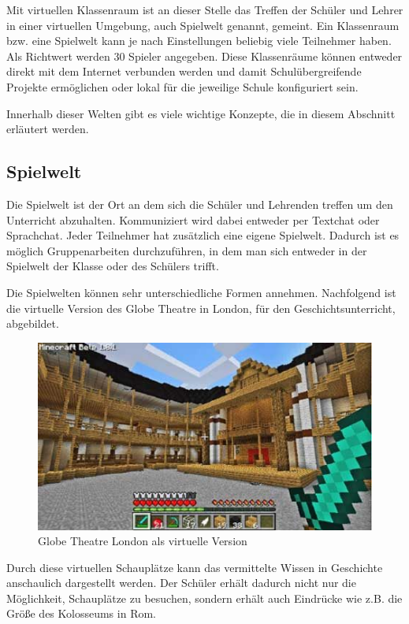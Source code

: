 Mit virtuellen Klassenraum ist an dieser Stelle das Treffen der Schüler und Lehrer in einer virtuellen Umgebung, auch Spielwelt genannt, gemeint. Ein Klassenraum bzw. eine Spielwelt kann je nach Einstellungen beliebig viele Teilnehmer haben. Als Richtwert werden 30 Spieler angegeben. Diese Klassenräume können entweder direkt mit dem Internet verbunden werden und damit Schulübergreifende Projekte ermöglichen oder lokal für die jeweilige Schule konfiguriert sein.

Innerhalb dieser Welten gibt es viele wichtige Konzepte, die in diesem Abschnitt erläutert werden.

\subsection{Spielwelt}

Die Spielwelt ist der Ort an dem sich die Schüler und Lehrenden treffen um den Unterricht abzuhalten.
Kommuniziert wird dabei entweder per Textchat oder Sprachchat. Jeder Teilnehmer hat zusätzlich eine eigene Spielwelt. Dadurch ist es möglich Gruppenarbeiten durchzuführen, in dem man sich entweder in der Spielwelt der Klasse oder des Schülers trifft.

Die Spielwelten können sehr unterschiedliche Formen annehmen. Nachfolgend ist die virtuelle Version des Globe Theatre in London, für den Geschichtsunterricht, abgebildet.

\begin{figure}[ht]
	\centering
	\includegraphics[width=\textwidth,height=\textheight,keepaspectratio]{images/GlobeTheatreLondon.png}
	\caption{Globe Theatre London als virtuelle Version \cite{EdutopiaIdeas}}
	\label{globeTheatreLondon}
\end{figure}

Durch diese virtuellen Schauplätze kann das vermittelte Wissen in Geschichte anschaulich dargestellt werden. Der Schüler erhält dadurch nicht nur die Möglichkeit, Schauplätze zu besuchen, sondern erhält auch Eindrücke wie z.B. die Größe des Kolosseums in Rom. \cite{EdutopiaIdeas}


